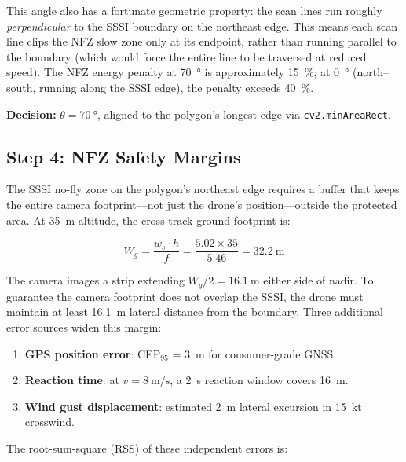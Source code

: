 This angle also has a fortunate geometric property: the scan lines run roughly \emph{perpendicular} to the SSSI boundary on the northeast edge.
This means each scan line clips the NFZ slow zone only at its endpoint, rather than running parallel to the boundary (which would force the entire line to be traversed at reduced speed).
The NFZ energy penalty at \SI{70}{\degree} is approximately \SI{15}{\percent}; at \SI{0}{\degree} (north--south, running along the SSSI edge), the penalty exceeds \SI{40}{\percent}.

\textbf{Decision:} $\theta = \SI{70}{\degree}$, aligned to the polygon's longest edge via \texttt{cv2.minAreaRect}.

\subsection{Step 4: NFZ Safety Margins}\label{sec:step-nfz-margins}

The SSSI no-fly zone on the polygon's northeast edge requires a buffer that keeps the entire camera footprint---not just the drone's position---outside the protected area.
At \SI{35}{\metre} altitude, the cross-track ground footprint is:

\begin{equation}\label{eq:footprint-cross}
  W_g = \frac{w_s \cdot h}{f} = \frac{5.02 \times 35}{5.46} = \SI{32.2}{\metre}
\end{equation}

The camera images a strip extending $W_g / 2 = \SI{16.1}{\metre}$ either side of nadir.
To guarantee the camera footprint does not overlap the SSSI, the drone must maintain at least \SI{16.1}{\metre} lateral distance from the boundary.
Three additional error sources widen this margin:

\begin{enumerate}
  \item \textbf{GPS position error}: CEP$_{95}$ = \SI{3}{\metre} for consumer-grade GNSS.
  \item \textbf{Reaction time}: at $v = \SI{8}{\metre\per\second}$, a \SI{2}{\second} reaction window covers \SI{16}{\metre}.
  \item \textbf{Wind gust displacement}: estimated \SI{2}{\metre} lateral excursion in \SI{15}{kt} crosswind.
\end{enumerate}

The root-sum-square (RSS) of these independent errors is:

